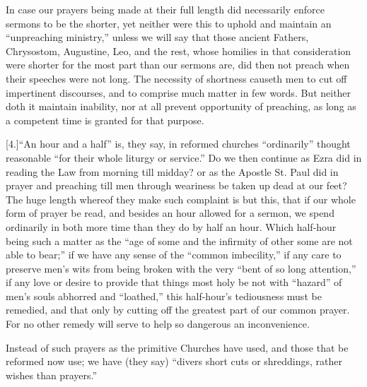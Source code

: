 In case our prayers being made at their full length did necessarily enforce sermons to be the shorter, yet neither were this to uphold and maintain an “unpreaching ministry,” unless we will say that those ancient Fathers, Chrysostom, Augustine, Leo, and the rest, whose homilies in that consideration were shorter for the most part than our sermons are, did then not preach when their speeches were not long. The necessity of shortness causeth men to cut off impertinent discourses, and to comprise much matter in few words. But neither doth it maintain inability, nor at all prevent opportunity of preaching, as long as a competent time is granted for that purpose.

[4.]“An hour and a half” is, they say, in reformed churches “ordinarily” thought reasonable “for their whole liturgy or service.” Do we then continue as Ezra did in reading the Law from morning till midday? or as the Apostle St. Paul did in prayer and preaching till men through weariness be taken up dead at our feet? The huge length whereof they make such complaint is but this, that if our whole form of prayer be read, and besides an hour allowed for a sermon, we spend ordinarily in both more time than they do by half an hour. Which half-hour being such a  matter as the “age of some and the infirmity of other some are not able to bear;”
 if we have any sense of the “common imbecility,” if any care to preserve men’s wits from being broken with the very “bent of so long attention,” if any love or desire to provide that things most holy be not with “hazard” of men’s souls abhorred and “loathed,” this half-hour’s tediousness must be remedied, and that only by cutting off the greatest part of our common prayer. For no other remedy will serve to help so dangerous an inconvenience.


Instead of such prayers as the primitive Churches have used, and those that be reformed now use; we have (they say) “divers short cuts or shreddings, rather wishes than prayers.”
